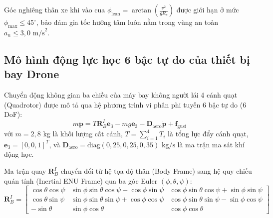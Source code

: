 \begin{table}[H]
\centering
\caption{Đặc tính động học quay vòng của mô hình xe máy theo các góc bẻ lái $\delta_{\text{steer}}$}
\label{tab:motorcycle-turning-kinematics}
\end{table}

Góc nghiêng thân xe khi vào cua $\phi_{\text{lean}} = \arctan\left(\frac{v^2}{g R_c}\right)$ được giới hạn ở mức $\phi_{\max} \le 45^\circ$, bảo đảm gia tốc hướng tâm luôn nằm trong vùng an toàn $a_n \le 3{,}0\text{ m/s}^2$.

\subsection{Mô hình động lực học 6 bậc tự do của thiết bị bay Drone}

\hspace{0.5cm} Chuyển động không gian ba chiều của máy bay không người lái 4 cánh quạt (Quadrotor) được mô tả qua hệ phương trình vi phân phi tuyến 6 bậc tự do (6 DoF):
\begin{equation}
m \ddot{\mathbf{p}} = T \mathbf{R}_B^I \mathbf{e}_3 - m g \mathbf{e}_3 - \mathbf{D}_{\text{aero}} \dot{\mathbf{p}} + \mathbf{f}_{\text{gust}}
\label{eq:drone-6dof-translational-dynamics}
\end{equation}
với $m = 2{,}8$ kg là khối lượng cất cánh, $T = \sum_{i=1}^4 T_i$ là tổng lực đẩy cánh quạt, $\mathbf{e}_3 = [0, 0, 1]^T$, và $\mathbf{D}_{\text{aero}} = \text{diag}(0{,}25, 0{,}25, 0{,}35)\text{ kg/s}$ là ma trận ma sát khí động học.

Ma trận quay $\mathbf{R}_B^I$ chuyển đổi từ hệ tọa độ thân (Body Frame) sang hệ quy chiếu quán tính (Inertial ENU Frame) qua ba góc Euler $(\phi, \theta, \psi)$:
\begin{equation}
\mathbf{R}_B^I = \begin{bmatrix}
\cos\theta\cos\psi & \sin\phi\sin\theta\cos\psi - \cos\phi\sin\psi & \cos\phi\sin\theta\cos\psi + \sin\phi\sin\psi \\
\cos\theta\sin\psi & \sin\phi\sin\theta\sin\psi + \cos\phi\cos\psi & \cos\phi\sin\theta\sin\psi - \sin\phi\cos\psi \\
-\sin\theta & \sin\phi\cos\theta & \cos\phi\cos\theta
\end{bmatrix}
\label{eq:euler-rotation-matrix-3d}
\end{equation}

